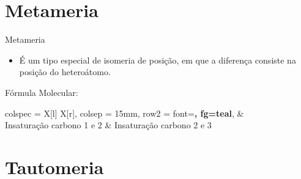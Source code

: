 \documentclass[presentation,professionalfonts,aspectratio=169]{beamer}
\begin{document}
\section{Metameria}
\label{sec:org1b0108e}

\begin{frame}[label={sec:org479a4aa}]{Metameria}
\begin{itemize}
\item É um tipo especial de isomeria de posição, em que a diferença consiste na posição do \alert{heteroátomo}.
\end{itemize}



\begin{bclogo}[couleur=yellow!30 , arrondi=0.1 , logo=\bcplume , epBarre=3.5]{Fórmula Molecular: }


\small{
\begin{tblr}
{
colspec = {X[l] X[r]},
colsep = 15mm,
row{2} = {font=\bfseries, fg=teal},
}
& 
 \\
Insaturação carbono 1 e 2  & Insaturação carbono 2 e 3 \\
\end{tblr}
}
\end{bclogo}
\end{frame}




\section{Tautomeria}
\label{sec:org24b81d5}
\end{document}
